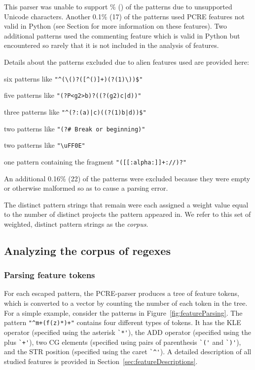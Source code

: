 This parser was unable to support \% () of the patterns due to unsupported Unicode characters.  Another 0.1\% (17) of the patterns used PCRE features not valid in Python (see Section for more information on these features).  Two additional patterns used the commenting feature which is valid in Python but encountered so rarely that it is not included in the analysis of features.

Details about the patterns excluded due to alien features used are provided here:
\begin{description} \itemsep -1pt
\item [IFC (If conditionals)] six patterns like \verb!"^(\()?([^()]+)(?(1)\))$"!
\item [NCND (Named conditions)] five patterns like \verb!"(?P<g2>b)?((?(g2)c|d))"!
\item [IFEC (If-else conditionals)] three patterns like \verb!"^(?:(a)|c)((?(1)b|d))$"!
\item [ECOM (Comments)] two patterns like \verb!"(?# Break or beginning)"!
\item [LHX (Long hex)] two patterns like \verb!"\uFF0E"!
\item [PXCC (Posix character classes)] one pattern containing the fragment \verb!"([[:alpha:]]+://)?"!
\end{description}

An additional 0.16\% (22) of the patterns were excluded because they were empty or otherwise malformed so as to cause a parsing error.

The  distinct pattern strings that remain were each assigned a weight value equal to the number of distinct projects the pattern appeared in.  We  refer to this set of weighted, distinct pattern strings as the \emph{corpus}.

\subsection{Analyzing the corpus of regexes}
\label{sec:corpusAnalyzing}

\subsubsection{Parsing feature tokens}
For each escaped pattern, the PCRE-parser produces a tree of feature tokens, which is converted to a vector by counting the number of each token in the tree.  For a simple example, consider the patterns in Figure~\ref{fig:featureParsing}.  The pattern \verb!"^m+(f(z)*)+"! contains four different types of tokens. It has the KLE operator (specified using the asterisk \verb!`*'!), the ADD operator (specified using the plus \verb!`+'!), two CG elements (specified using pairs of parenthesis \verb!`('! and \verb!`)'!), and the STR position (specified using the caret \verb!`^'!). A detailed description of all studied features is provided in Section~\ref{sec:featureDescriptions}.


